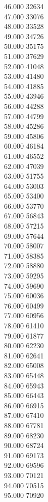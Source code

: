 { 46.000	32634 \\
 47.000	33076 \\
 48.000	33528 \\
 49.000	34726 \\
 50.000	35175 \\
 51.000	37629 \\
 52.000	41048 \\
 53.000	41480 \\
 54.000	41885 \\
 55.000	43946 \\
 56.000	44288 \\
 57.000	44799 \\
 58.000	45286 \\
 59.000	45806 \\
 60.000	46184 \\
 61.000	46552 \\
 62.000	47039 \\
 63.000	51755 \\
 64.000	53003 \\
 65.000	53400 \\
 66.000	53770 \\
 67.000	56843 \\
 68.000	57215 \\
 69.000	57644 \\
 70.000	58007 \\
 71.000	58385 \\
 72.000	58880 \\
 73.000	59295 \\
 74.000	59690 \\
 75.000	60036 \\
 76.000	60499 \\
 77.000	60956 \\
 78.000	61410 \\
 79.000	61877 \\
 80.000	62230 \\
 81.000	62641 \\
 82.000	65008 \\
 83.000	65448 \\
 84.000	65943 \\
 85.000	66443 \\
 86.000	66915 \\
 87.000	67410 \\
 88.000	67781 \\
 89.000	68230 \\
 90.000	68724 \\
 91.000	69173 \\
 92.000	69596 \\
 93.000	70121 \\
 94.000	70515 \\
 95.000	70920 \\
}

